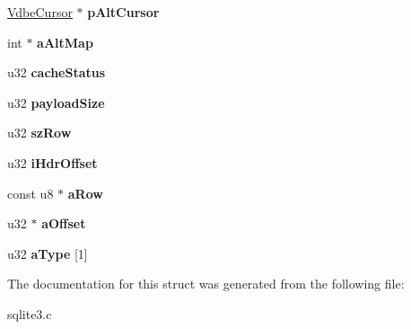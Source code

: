 \begin{DoxyCompactItemize}
\item 
\hyperlink{structVdbeCursor}{Vdbe\+Cursor} $\ast$ {\bfseries p\+Alt\+Cursor}\hypertarget{structVdbeCursor_acc57fe0cffe660d0d08ac422dfa20af5}{}\label{structVdbeCursor_acc57fe0cffe660d0d08ac422dfa20af5}

\item 
int $\ast$ {\bfseries a\+Alt\+Map}\hypertarget{structVdbeCursor_a78b9a4b46b24e0f7a6b6b58e1e51c2ac}{}\label{structVdbeCursor_a78b9a4b46b24e0f7a6b6b58e1e51c2ac}

\item 
u32 {\bfseries cache\+Status}\hypertarget{structVdbeCursor_acf243b5a94a6e5a11341d6fece473c00}{}\label{structVdbeCursor_acf243b5a94a6e5a11341d6fece473c00}

\item 
u32 {\bfseries payload\+Size}\hypertarget{structVdbeCursor_a92f39b19e82152386e20ede96d177058}{}\label{structVdbeCursor_a92f39b19e82152386e20ede96d177058}

\item 
u32 {\bfseries sz\+Row}\hypertarget{structVdbeCursor_ac0fa6de4df7f418dfd5307cb892ba455}{}\label{structVdbeCursor_ac0fa6de4df7f418dfd5307cb892ba455}

\item 
u32 {\bfseries i\+Hdr\+Offset}\hypertarget{structVdbeCursor_a838b93338c0a8539e28697e291c83a91}{}\label{structVdbeCursor_a838b93338c0a8539e28697e291c83a91}

\item 
const u8 $\ast$ {\bfseries a\+Row}\hypertarget{structVdbeCursor_a6b6f7444963e83e48cd3d63edf539c94}{}\label{structVdbeCursor_a6b6f7444963e83e48cd3d63edf539c94}

\item 
u32 $\ast$ {\bfseries a\+Offset}\hypertarget{structVdbeCursor_a17431e67b341282aeb6c026cd01ec1e9}{}\label{structVdbeCursor_a17431e67b341282aeb6c026cd01ec1e9}

\item 
u32 {\bfseries a\+Type} \mbox{[}1\mbox{]}\hypertarget{structVdbeCursor_aa4a4b02d8b0276a413f1191382469141}{}\label{structVdbeCursor_aa4a4b02d8b0276a413f1191382469141}

\end{DoxyCompactItemize}


The documentation for this struct was generated from the following file\+:\begin{DoxyCompactItemize}
\item 
sqlite3.\+c\end{DoxyCompactItemize}
